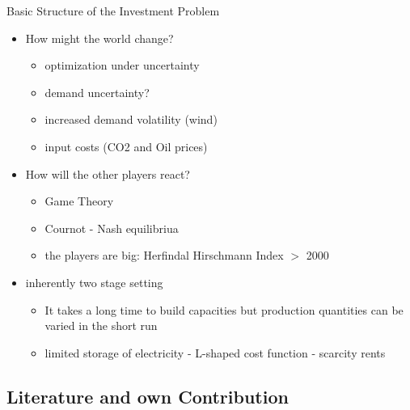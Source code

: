 \begin{frame}{Basic Structure of the Investment Problem}

\begin{itemize}
	\item How might the world change?
\begin{itemize}
  \item optimization under uncertainty
	\item demand uncertainty?
	\item increased demand volatility (wind)
	\item input costs (CO2 and Oil prices)
\end{itemize}

  \item How will the other players react?
  
\begin{itemize}
	\item Game Theory
	\item Cournot - Nash equilibriua
	\item the players are big: Herfindal Hirschmann Index $>$ 2000
\end{itemize}
\end{itemize}

\begin{itemize}
	\item inherently two stage setting
	
\begin{itemize}
	\item It takes a long time to build capacities but production quantities can be varied in the short run
	\item limited storage of electricity - L-shaped cost function - scarcity rents
\end{itemize}
\end{itemize}

\end{frame}
\subsection{Literature and own Contribution}


